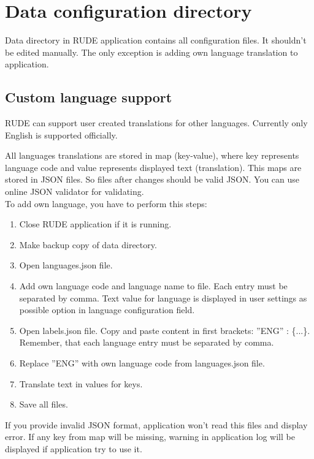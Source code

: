 \section{Data configuration directory}\label{section:data-config}

Data directory in RUDE application contains all configuration files. It shouldn't be edited manually. The only exception is adding own language translation to application.

\subsection{Custom language support}\label{sub:config-labels}

RUDE can support user created translations for other languages. Currently only English is supported officially.

All languages translations are stored in map (key-value), where key represents language code and value represents displayed text (translation). This maps are stored in JSON files. So files after changes should be valid JSON. You can use online JSON validator for validating.\\

To add own language, you have to perform this steps:
\begin{enumerate}
	\item Close RUDE application if it is running.
	\item Make backup copy of data directory.
	\item Open languages.json file.
	\item Add own language code and language name to file. Each entry must be separated by comma. Text value for language is displayed in user settings as possible option in language configuration field.
	\item Open labels.json file. Copy and paste content in first brackets: ''ENG'' : \{...\}. Remember, that each language entry must be separated by comma.
	\item Replace ''ENG'' with own language code from languages.json file.
	\item Translate text in values for keys.
	\item Save all files.
\end{enumerate}


If you provide invalid JSON format, application won't read this files and display error. If any key from map will be missing, warning in application log will be displayed if application try to use it.

\vfill\newpage